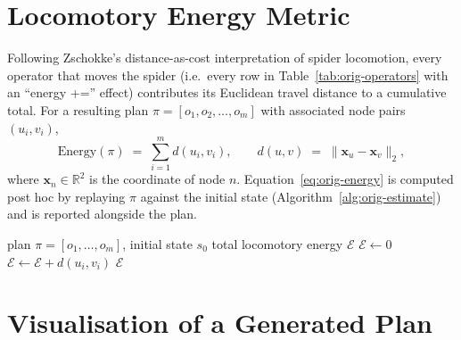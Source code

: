 \section{Locomotory Energy Metric}
\label{sec:orig-energy}

Following Zschokke's distance-as-cost interpretation of spider locomotion, every operator that moves the spider (i.e.\ every row in Table~\ref{tab:orig-operators} with an ``energy +='' effect) contributes its Euclidean travel distance to a cumulative total. For a resulting plan $\pi = [o_1, o_2, \dots, o_m]$ with associated node pairs $(u_i, v_i)$,
\begin{equation}
  \mathrm{Energy}(\pi) \;=\; \sum_{i=1}^{m} d(u_i, v_i), \qquad d(u, v) \;=\; \lVert \mathbf{x}_u - \mathbf{x}_v \rVert_2,
  \label{eq:orig-energy}
\end{equation}
where $\mathbf{x}_n \in \mathbb{R}^2$ is the coordinate of node $n$. Equation~\eqref{eq:orig-energy} is computed post hoc by replaying $\pi$ against the initial state (Algorithm~\ref{alg:orig-estimate}) and is reported alongside the plan.

\begin{algorithm}[H]
\algrenewcommand{}
\algrenewcommand{}
\caption{\textsc{EstimateEnergy} --- post-hoc plan-cost evaluation}
\label{alg:orig-estimate}
\begin{algorithmic}[1]
\Require plan $\pi = [o_1, \dots, o_m]$, initial state $s_0$
\Ensure total locomotory energy $\mathcal{E}$
\State $\mathcal{E} \gets 0$
    \State $\mathcal{E} \gets \mathcal{E} + d(u_i, v_i)$
  \EndIf
\EndFor
\State \Return $\mathcal{E}$
\end{algorithmic}
\end{algorithm}

\section{Visualisation of a Generated Plan}
\label{sec:orig-vis}

